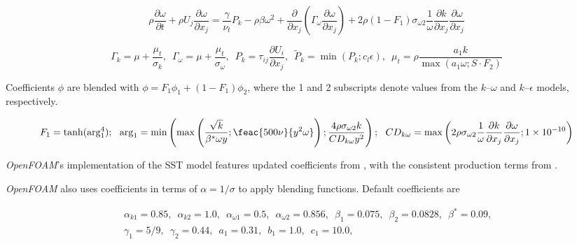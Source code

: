 \begin{equation}
    \rho \frac{\partial \omega}{\partial t}
    + \rho U_j \frac{\partial \omega}{\partial x_j}
    = \frac{\gamma}{\nu_t} P_k - \rho \beta \omega^2
    + \frac{\partial}{\partial x_j}
    \left(
    \Gamma_\omega \frac{\partial \omega}{\partial x_j}
    \right)
    + 2 \rho (1 - F_1) \sigma_{\omega 2}
    \frac{1}{\omega} \frac{\partial k}{\partial x_j}
    \frac{\partial \omega}{\partial x_j}
\end{equation}

\begin{equation}
    \Gamma_k = \mu + \frac{\mu_t}{\sigma_k}, \, \, \,
    \Gamma_\omega = \mu + \frac{\mu_t}{\sigma_\omega}, \, \, \,
    P_k = \tau_{ij} \frac{\partial U_i}{\partial x_j}, \, \, \,
    \tilde{P}_k = \min(P_k;c_l \epsilon), \, \, \,
    \mu_t = \rho \frac{a_1 k}{\max(a_1 \omega; S \cdot F_2)}
\end{equation}

Coefficients $\phi$ are blended with $\phi = F_1 \phi_1 + (1 - F_1) \phi_2$,
where the 1 and 2 subscripts denote values from the $k$--$\omega$ and
$k$--$\epsilon$ models, respectively.

\begin{equation}
    F_1 = \tanh (\arg_1^4); \, \, \, \,
    \arg_1 = \min
    \left(
    \max
    \left(
    \frac{\sqrt{k}}{\beta^* \omega y};
    \feac{500 \nu}{y^2 \omega}
    \right);
    \frac{4 \rho \sigma_{\omega2} k}{CD_{k \omega} y^2}
    \right); \, \, \, \,
    CD_{k \omega} = \max
    \left(
    2 \rho \sigma_{\omega 2} \frac{1}{\omega}
    \frac{\partial k}{\partial x_j}
    \frac{\partial \omega}{\partial x_j};
    1 \times 10^{-10}
    \right)
\end{equation}

\textit{OpenFOAM}'s implementation of the SST model features updated
coefficients from \cite{Menter2003}, with the consistent production terms from
\cite{Menter2001}.

\textit{OpenFOAM} also uses coefficients in terms of $\alpha = 1/\sigma$ to
apply blending functions. Default coefficients are

\begin{equation}
\begin{split}
&   \alpha_{k1} = 0.85, \, \, \,
    \alpha_{k2} = 1.0, \, \, \,
    \alpha_{\omega1} = 0.5, \, \, \,
    \alpha_{\omega2} = 0.856, \, \, \,
    \beta_1 = 0.075, \, \, \,
    \beta_2 = 0.0828, \, \, \,
    \beta^* = 0.09, \, \, \, \\
&   \gamma_1 = 5/9, \, \, \,
    \gamma_2 = 0.44, \, \, \,
    a_1 = 0.31, \, \, \,
    b_1 = 1.0, \, \, \,
    c_1 = 10.0, \, \, \,
\end{split}
\end{equation}



